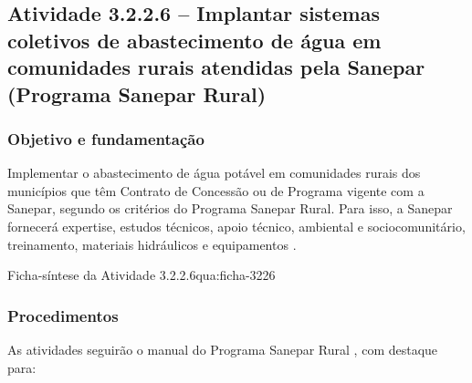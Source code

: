 \subsection{Atividade 3.2.2.6 -- Implantar sistemas coletivos de abastecimento de água em comunidades rurais atendidas pela Sanepar (Programa Sanepar Rural)}
\label{subsec:sanepar-rural}

\subsubsection{Objetivo e fundamentação}

Implementar o abastecimento de água potável em comunidades rurais dos
municípios que têm Contrato de Concessão ou de Programa vigente com a Sanepar,
segundo os critérios do Programa Sanepar Rural. Para isso, a Sanepar
fornecerá expertise, estudos técnicos, apoio técnico, ambiental e
sociocomunitário, treinamento, materiais hidráulicos e equipamentos
\cite{mop2026}.

\begin{fichaatividade}{Ficha-síntese da Atividade 3.2.2.6}{qua:ficha-3226}
\end{fichaatividade}

\subsubsection{Procedimentos}

As atividades seguirão o manual do Programa Sanepar Rural \cite{saneparrural},
com destaque para:

